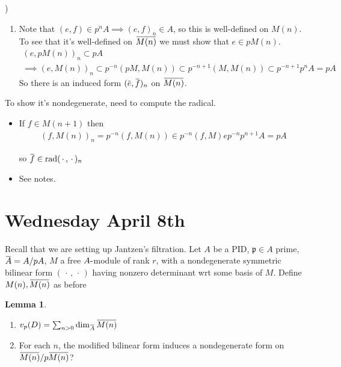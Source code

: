 \documentclass[11pt]{scrartcl}
\theoremstyle{definition}
\theoremstyle{theorem}
\newtheorem{lemma}[theorem]{Lemma}
\theoremstyle{proof}
\newenvironment{proof}
{\pushQED{$\qed$}\pf}
{\par\popQED\endpf}
\theoremstyle{definition}
\theoremstyle{break}
\theoremstyle{problem}
\providecommand{\tightlist}{%
  \setlength{\itemsep}{0pt}\setlength{\parskip}{0pt}}
\newcommand{\dash}[0]{{\hbox{-}}}
\newcommand{\mfp}[0]{{\mathfrak{p}}}
\newcommand{\rad}[0]{{\mathrm{rad}}}
\newcommand{\wait}[0]{{\,\cdot\,}}
\renewcommand{\bar}[1]{\mkern 1.5mu\overline{\mkern-1.5mu#1\mkern-1.5mu}\mkern 1.5mu}
\renewcommand{\qed}[0]{\hfill\blacksquare}
\begin{document}
\begin{proof}[of (b] )

\hfill

\begin{enumerate}
\def\labelenumi{\arabic{enumi}.}
\tightlist
\item
  Note that \((e, f) \in p^n A \implies (e, f)_n \in A\), so this is
  well-defined on \(M(n)\). To see that it's well-defined on
  \(\bar{M(n)}\) we must show that \(e \in p M(n)\).
  \begin{align*}
    (e, pM(n))_n \subset pA \\
    \implies (e, M(n))_n \subset p^{-n}(pM, M(n)) \subset p^{-n+1}(M, M(n)) \subset p^{-n+1}p^n A = pA
    \end{align*} So there is an induced form \((\bar e, \bar f)_n\) on
  \(\bar{M(n)}\).
\end{enumerate}

To show it's nondegenerate, need to compute the radical.

\begin{itemize}
\item
  If \(f\in M(n+1)\) then
  \begin{align*}
  (f, M(n))_{n}=p^{-n}(f, M(n)) \in p^{-n}(f, M) e p^{-n} p^{n+1} A=p A
  \end{align*}

  so \(\bar f \in \rad (\wait, \wait)_n\)
\item
  See notes.
\end{itemize}

\end{proof}

\hypertarget{wednesday-april-8th}{%
\section{Wednesday April 8th}\label{wednesday-april-8th}}

Recall that we are setting up Jantzen's filtration. Let \(A\) be a PID,
\(\mfp \in A\) prime, \(\bar A = A/pA\), \(M\) a free \(A\dash\)module
of rank \(r\), with a nondegenerate symmetric bilinear form
\((\wait ,\wait)\) having nonzero determinant wrt some basis of \(M\).
Define \(M(n), \bar{M(n)}\) as before

\begin{lemma}

\hfill

\begin{enumerate}
\def\labelenumi{\arabic{enumi}.}
\tightlist
\item
  \(v_p(D) = \sum_{n > 0} \dim_{\bar A} \bar{M(n)}\)
\item
  For each \(n\), the modified bilinear form induces a nondegenerate
  form on \(\bar{M(n)} / p\bar{M(n)}\)?
\end{enumerate}

\end{lemma}
\end{document}
